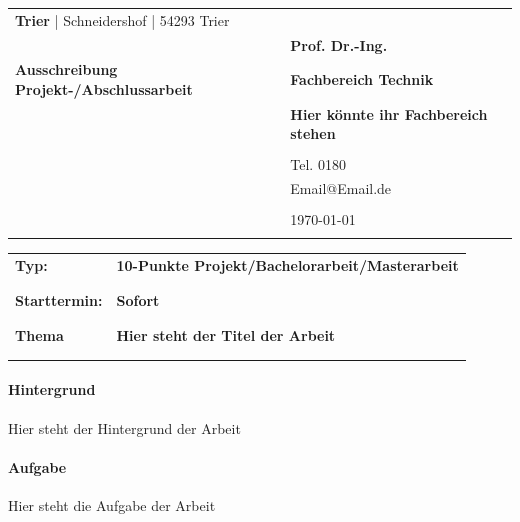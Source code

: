 \documentclass{article}
\makeatletter
\newcommand{\Fachbereich}{Hier könnte ihr Fachbereich stehen}
\newcommand{\Betreuer}{Prof. Dr.-Ing. }
\newcommand{\Titel}{Hier steht der Titel der Arbeit}
\newcommand{\Startzeitpunkt}{Sofort}
\newcommand{\TypDerArbeit}{10-Punkte Projekt/Bachelorarbeit/Masterarbeit}
\newcommand{\Email}{Email@Email.de}
\newcommand{\Labor}{}
\newcommand{\Telefonnummer}{0180}
\newcommand{\Hintergrund}{


Hier steht der Hintergrund der Arbeit





}
\newcommand{\Aufgabe}{



Hier steht die Aufgabe der Arbeit




\cite{aristotle:physics}

}
\makeatother
\begin{document}
\begin{tabular}{p{10cm}p{6cm}}
\textbf{Trier} | Schneidershof | 54293 Trier & \textbf{\Labor}\\
&\textbf{\Betreuer}\\
{\large \textbf{Ausschreibung Projekt-/Abschlussarbeit}}&\textbf{Fachbereich Technik}\\
&\textbf{\Fachbereich}\\
&\\
&{\small Tel. \Telefonnummer}\\
&{\small \Email}\\
&\\
&\today\\
&\\
\end{tabular}

\begin{tabular}{p{3cm} p{12cm}}
{\textbf{Typ:}}&{\textbf{\TypDerArbeit}}\\
&\\
&\\
{\textbf{Starttermin:}}&{\textbf{\Startzeitpunkt}}\\
&\\
&\\
{\textbf{Thema}}&{\textbf{\Titel}}\\
&\\
&\\
\end{tabular}



\paragraph*{Hintergrund} \Hintergrund
\paragraph*{Aufgabe} \Aufgabe
\printbibliography
\end{document}
